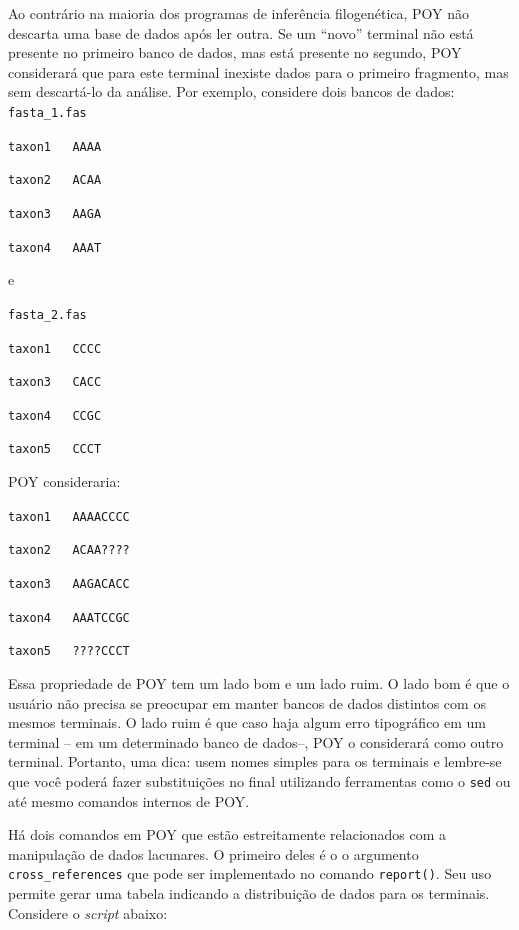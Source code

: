 \begin{refsection}
Ao contrário na maioria dos programas de inferência filogenética, POY não descarta uma base de dados após ler outra. Se um ``novo'' terminal não está presente no primeiro banco de dados, mas está presente no segundo, POY considerará que para este terminal inexiste dados para o primeiro fragmento, mas sem descartá-lo da análise. Por exemplo, considere dois bancos de dados:\\

\texttt{fasta\_1.fas}

\scriptsize
\texttt{taxon1~~~AAAA}

\texttt{taxon2~~~ACAA}

\texttt{taxon3~~~AAGA}

\texttt{taxon4~~~AAAT}

\normalsize

e

\texttt{fasta\_2.fas}

\scriptsize
\texttt{taxon1~~~CCCC}

\texttt{taxon3~~~CACC}

\texttt{taxon4~~~CCGC}

\texttt{taxon5~~~CCCT}

\normalsize

POY consideraria:

\scriptsize
\texttt{taxon1~~~AAAACCCC}

\texttt{taxon2~~~ACAA????}

\texttt{taxon3~~~AAGACACC}

\texttt{taxon4~~~AAATCCGC}

\texttt{taxon5~~~????CCCT}\\

\normalsize

Essa propriedade de POY tem um lado bom e um lado ruim. O lado bom é que o usuário não precisa se preocupar em manter bancos de dados distintos com os mesmos terminais. O lado ruim é que caso haja algum erro tipográfico em um terminal -- em um determinado banco de dados--, POY o considerará como outro terminal. Portanto, uma dica: usem nomes simples para os terminais e lembre-se que você poderá fazer substituições no final utilizando ferramentas como o \texttt{sed} ou até mesmo comandos internos de POY.

Há dois comandos em POY que estão estreitamente relacionados com a manipulação de dados lacunares. O primeiro deles é o o argumento \texttt{cross\_references} que pode ser implementado no comando \texttt{report()}. Seu uso permite gerar uma tabela indicando a distribuição de dados para os terminais. Considere o \textit{script} abaixo:\\


\end{refsection}
